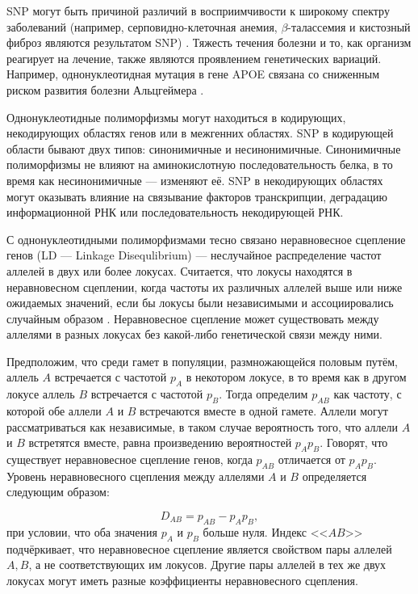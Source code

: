 SNP могут быть причиной различий в восприимчивости к широкому спектру заболеваний (например, серповидно-клеточная анемия, $\beta$-талассемия и кистозный фиброз являются результатом SNP) \autocite{INGRAM1956, Chang1979, Reiss1993}. Тяжесть течения болезни и то, как организм реагирует на лечение, также являются проявлением генетических вариаций. Например, однонуклеотидная мутация в гене APOE связана со сниженным риском развития болезни Альцгеймера \autocite{Wolf2013}.

Однонуклеотидные полиморфизмы могут находиться в кодирующих, некодирующих областях генов или в межгенних областях. SNP в кодирующей области бывают двух типов: синонимичные и несинонимичные. Синонимичные полиморфизмы не влияют на аминокислотную последовательность белка, в то время как несинонимичные --- изменяют её. SNP в некодирующих областях могут оказывать влияние на связывание факторов транскрипции, деградацию информационной РНК или последовательность некодирующей РНК. 


С однонуклеотидными полиморфизмами тесно связано неравновесное сцепление генов (LD --- Linkage Disequlibrium) --- неслучайное распределение частот аллелей в двух или более локусах. Считается, что локусы находятся в неравновесном сцеплении, когда частоты их различных аллелей выше или ниже ожидаемых значений, если бы локусы были независимыми и ассоциировались случайным образом \autocite{Slatkin2008}. Неравновесное сцепление может существовать между аллелями в разных локусах без какой-либо генетической связи между ними. 

Предположим, что среди гамет в популяции, размножающейся половым путём, аллель $A$ встречается с частотой $p_{A}$ в некотором локусе, в то время как в другом локусе аллель $B$ встречается с частотой $p_{B}$. Тогда определим $p_{AB}$ как частоту, с которой обе аллели $A$ и $B$ встречаются вместе в одной гамете. Аллели могут рассматриваться как независимые, в таком случае вероятность того, что аллели $A$ и $B$ встретятся вместе, равна произведению вероятностей $p_{A}p_{B}$. Говорят, что существует неравновесное сцепление генов, когда $p_{AB}$ отличается от $p_{A}p_{B}$. Уровень неравновесного сцепления между аллелями $A$ и $B$ определяется следующим образом: 

\begin{equation}
\label{eq:LD}
D_{AB} = p_{AB} - p_{A}p_{B},
\end{equation}
при условии, что оба значения $p_{A}$ и $p_{B}$ больше нуля. Индекс <<$AB$>> подчёркивает, что неравновесное сцепление является свойством пары аллелей ${A, B}$, а не соответствующих им локусов. Другие пары аллелей в тех же двух локусах могут иметь разные коэффициенты неравновесного сцепления.

